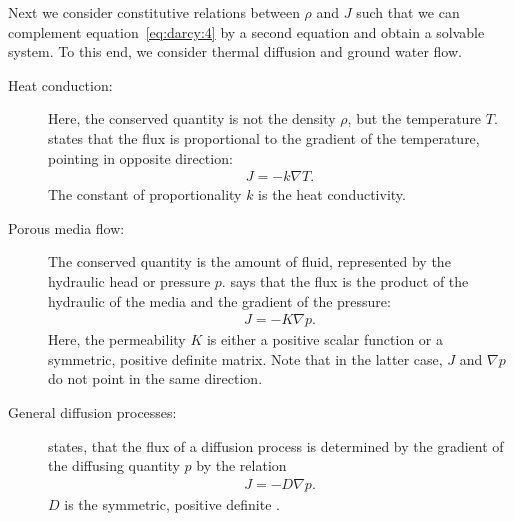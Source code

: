 \begin{example}
  Next we consider constitutive relations between $\rho$ and $J$ such
  that we can complement equation~\eqref{eq:darcy:4} by a second
  equation and obtain a solvable system. To this end, we consider
  thermal diffusion and ground water flow.

  \begin{description}
  \item[Heat conduction:] Here, the conserved quantity is not the
    density $\rho$, but the temperature $T$. 
    states that the flux is proportional to the gradient of the
    temperature, pointing in opposite direction:
    \begin{gather*}
      J = -k\nabla T.
    \end{gather*}
    The constant of proportionality $k$ is the heat conductivity.
  \item[Porous media flow:] The conserved quantity is the amount of
    fluid, represented by the hydraulic head or pressure
    $p$.  says that the flux is the product of the
    hydraulic  of the media and the gradient of the
    pressure:
    \begin{gather*}
      J = -K\nabla p.
    \end{gather*}
    Here, the permeability $K$ is either a positive scalar function or
    a symmetric, positive definite matrix. Note that in the latter
    case, $J$ and $\nabla p$ do not point in the same direction.
    \item[General diffusion processes:]  states,
      that the flux of a diffusion process is determined by the
      gradient of the diffusing quantity $p$ by the relation
    \begin{gather*}
      J = -D\nabla p.
    \end{gather*}
    $D$ is the symmetric, positive definite .
  \end{description}
\end{example}

